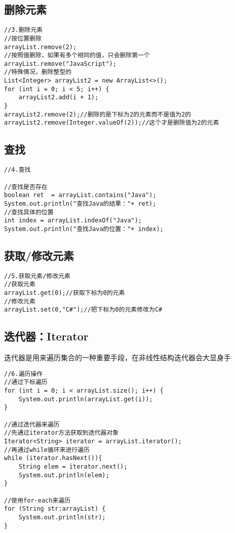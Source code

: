 \documentclass[a4paper]{report}
\begin{document}
\subsection{删除元素}
\begin{lstlisting}
//3.删除元素
//按位置删除
arrayList.remove(2);
//按照值删除，如果有多个相同的值，只会删除第一个
arrayList.remove("JavaScript");
//特殊情况，删除整型的
List<Integer> arrayList2 = new ArrayList<>();
for (int i = 0; i < 5; i++) {
    arrayList2.add(i + 1);
}
arrayList2.remove(2);//删除的是下标为2的元素而不是值为2的
arrayList2.remove(Integer.valueOf(2));//这个才是删除值为2的元素
\end{lstlisting}
\subsection{查找}
\begin{lstlisting}
//4.查找

//查找是否存在
boolean ret  = arrayList.contains("Java");
System.out.println("查找Java的结果："+ ret);
//查找具体的位置
int index = arrayList.indexOf("Java");
System.out.println("查找Java的位置："+ index);
\end{lstlisting}
\subsection{获取/修改元素}
\begin{lstlisting}
//5.获取元素/修改元素
//获取元素
arrayList.get(0);//获取下标为0的元素
//修改元素
arrayList.set(0,"C#");//把下标为0的元素修改为C#
\end{lstlisting}
\subsection{迭代器：Iterator}
迭代器是用来遍历集合的一种重要手段，在非线性结构迭代器会大显身手
\begin{lstlisting}
//6.遍历操作
//通过下标遍历
for (int i = 0; i < arrayList.size(); i++) {
    System.out.println(arrayList.get(i));
}

//通过迭代器来遍历
//先通过iterator方法获取到迭代器对象
Iterator<String> iterator = arrayList.iterator();
//再通过while循环来进行遍历
while (iterator.hasNext()){
    String elem = iterator.next();
    System.out.println(elem);
}

//使用for-each来遍历
for (String str:arrayList) {
    System.out.println(str);
}
\end{lstlisting}
\end{document}
